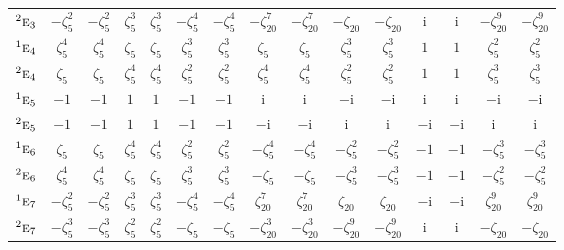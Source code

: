 \documentclass[10pt,a4paper]{article}
\numberwithin{equation}{section}
\newcommand{\irr}[1]{\text{\normalfont\scshape #1}}
\newcommand{\conjpair}[1]{{}^{#1}}
\newcommand{\iunit}{\mathrm{i}}
\newcommand{\rootunity}[1]{\zeta_{#1}}
\begin{document}
{\begin{longtable}{@{}lcccccccccccccc@{}}
$\conjpair{2}\irr{e}_{3}$ & $-\rootunity{5}^{2}$ & $-\rootunity{5}^{2}$ & $\rootunity{5}^{3}$ & $\rootunity{5}^{3}$ & $-\rootunity{5}^{4}$ & $-\rootunity{5}^{4}$ & $-\rootunity{20}^{7}$ & $-\rootunity{20}^{7}$ & $-\rootunity{20}$ & $-\rootunity{20}$ & $\iunit{}$ & $\iunit{}$ & $-\rootunity{20}^{9}$ & $-\rootunity{20}^{9}$\\
$\conjpair{1}\irr{e}_{4}$ & $\rootunity{5}^{4}$ & $\rootunity{5}^{4}$ & $\rootunity{5}$ & $\rootunity{5}$ & $\rootunity{5}^{3}$ & $\rootunity{5}^{3}$ & $\rootunity{5}$ & $\rootunity{5}$ & $\rootunity{5}^{3}$ & $\rootunity{5}^{3}$ & $1$ & $1$ & $\rootunity{5}^{2}$ & $\rootunity{5}^{2}$\\
$\conjpair{2}\irr{e}_{4}$ & $\rootunity{5}$ & $\rootunity{5}$ & $\rootunity{5}^{4}$ & $\rootunity{5}^{4}$ & $\rootunity{5}^{2}$ & $\rootunity{5}^{2}$ & $\rootunity{5}^{4}$ & $\rootunity{5}^{4}$ & $\rootunity{5}^{2}$ & $\rootunity{5}^{2}$ & $1$ & $1$ & $\rootunity{5}^{3}$ & $\rootunity{5}^{3}$\\
$\conjpair{1}\irr{e}_{5}$ & $-1$ & $-1$ & $1$ & $1$ & $-1$ & $-1$ & $\iunit{}$ & $\iunit{}$ & $-\iunit{}$ & $-\iunit{}$ & $\iunit{}$ & $\iunit{}$ & $-\iunit{}$ & $-\iunit{}$\\
$\conjpair{2}\irr{e}_{5}$ & $-1$ & $-1$ & $1$ & $1$ & $-1$ & $-1$ & $-\iunit{}$ & $-\iunit{}$ & $\iunit{}$ & $\iunit{}$ & $-\iunit{}$ & $-\iunit{}$ & $\iunit{}$ & $\iunit{}$\\
$\conjpair{1}\irr{e}_{6}$ & $\rootunity{5}$ & $\rootunity{5}$ & $\rootunity{5}^{4}$ & $\rootunity{5}^{4}$ & $\rootunity{5}^{2}$ & $\rootunity{5}^{2}$ & $-\rootunity{5}^{4}$ & $-\rootunity{5}^{4}$ & $-\rootunity{5}^{2}$ & $-\rootunity{5}^{2}$ & $-1$ & $-1$ & $-\rootunity{5}^{3}$ & $-\rootunity{5}^{3}$\\
$\conjpair{2}\irr{e}_{6}$ & $\rootunity{5}^{4}$ & $\rootunity{5}^{4}$ & $\rootunity{5}$ & $\rootunity{5}$ & $\rootunity{5}^{3}$ & $\rootunity{5}^{3}$ & $-\rootunity{5}$ & $-\rootunity{5}$ & $-\rootunity{5}^{3}$ & $-\rootunity{5}^{3}$ & $-1$ & $-1$ & $-\rootunity{5}^{2}$ & $-\rootunity{5}^{2}$\\
$\conjpair{1}\irr{e}_{7}$ & $-\rootunity{5}^{2}$ & $-\rootunity{5}^{2}$ & $\rootunity{5}^{3}$ & $\rootunity{5}^{3}$ & $-\rootunity{5}^{4}$ & $-\rootunity{5}^{4}$ & $\rootunity{20}^{7}$ & $\rootunity{20}^{7}$ & $\rootunity{20}$ & $\rootunity{20}$ & $-\iunit{}$ & $-\iunit{}$ & $\rootunity{20}^{9}$ & $\rootunity{20}^{9}$\\
$\conjpair{2}\irr{e}_{7}$ & $-\rootunity{5}^{3}$ & $-\rootunity{5}^{3}$ & $\rootunity{5}^{2}$ & $\rootunity{5}^{2}$ & $-\rootunity{5}$ & $-\rootunity{5}$ & $-\rootunity{20}^{3}$ & $-\rootunity{20}^{3}$ & $-\rootunity{20}^{9}$ & $-\rootunity{20}^{9}$ & $\iunit{}$ & $\iunit{}$ & $-\rootunity{20}$ & $-\rootunity{20}$\\

\end{longtable}}
\end{document}
